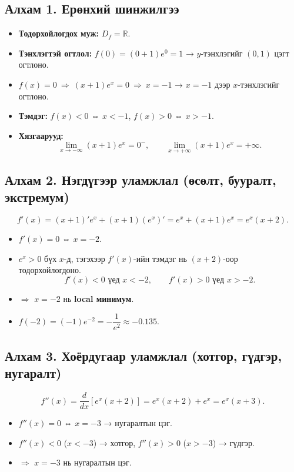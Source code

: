 \subsection*{Алхам 1. Ерөнхий шинжилгээ}
\begin{itemize}
  \item \textbf{Тодорхойлогдох муж:} $D_f=\mathbb{R}$.
  \item \textbf{Тэнхлэгтэй огтлол:} $f(0)=(0+1)e^0=1$ → $y$-тэнхлэгийг $(0,1)$ цэгт огтлоно.
  \item $f(x)=0 \ \Rightarrow\ (x+1)e^x=0 \ \Rightarrow\ x=-1$ → $x=-1$ дээр $x$-тэнхлэгийг огтлоно.
  \item \textbf{Тэмдэг:} $f(x)<0$ ⇔ $x<-1$, $f(x)>0$ ⇔ $x>-1$.
  \item \textbf{Хязгаарууд:} 
  \[
  \lim_{x\to -\infty} (x+1)e^x = 0^{-}, \qquad 
  \lim_{x\to +\infty} (x+1)e^x = +\infty.
  \]
\end{itemize}

\subsection*{Алхам 2. Нэгдүгээр уламжлал (өсөлт, бууралт, экстремум)}
\[
f'(x) = (x+1)'e^x + (x+1)(e^x)' = e^x + (x+1)e^x = e^x(x+2).
\]
\begin{itemize}
  \item $f'(x)=0$ ⇔ $x=-2$.
  \item $e^x>0$ бүх $x$-д, тэгэхээр $f'(x)$-ийн тэмдэг нь $(x+2)$-оор тодорхойлогдоно.
  \[
  f'(x)<0 \text{  үед } x<-2, \qquad f'(x)>0 \text{  үед } x>-2.
  \]
  \item $\Rightarrow$ $x=-2$ нь \textbf{local минимум}.
  \item $f(-2)=(-1)e^{-2}=-\dfrac{1}{e^2}\approx -0.135$.
\end{itemize}

\subsection*{Алхам 3. Хоёрдугаар уламжлал (хотгор, гүдгэр, нугаралт)}
\[
f''(x) = \frac{d}{dx}[e^x(x+2)] = e^x(x+2)+e^x=e^x(x+3).
\]
\begin{itemize}
  \item $f''(x)=0$ ⇔ $x=-3$ → нугаралтын цэг.
  \item $f''(x)<0$ ($x<-3$) → хотгор, $f''(x)>0$ ($x>-3$) → гүдгэр.
  \item $\Rightarrow$ $x=-3$ нь нугаралтын цэг.
\end{itemize}

